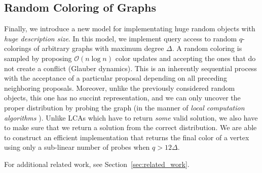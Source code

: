\subsection{Random Coloring of Graphs}%
\label{sec:random_coloring_of_graphs}
Finally, we introduce a new model for implementating huge random objects with \emph{huge description size}.
In this model, we implement query access to random $q$-colorings of arbitrary graphs with maximum degree $\Delta$.
A random coloring is sampled by proposing $\mathcal O(n\log n)$ color updates and accepting the ones that do not create a conflict (Glauber dynamics).
This is an inherently sequential process with the acceptance of a particular proposal depending on all preceding neighboring proposals.
Moreover, unlike the previously considered random objects, this one has no succint representation,
and we can only uncover the proper distribution by probing the graph (in the manner of \emph{local computation algorithms} \cite{LCA}).
Unlike LCAs which have to return \emph{some} valid solution, we also have to make sure that we return a solution from the correct distribution.
We are able to construct an efficient implementation that returns the final color of a vertex using only a sub-linear number of probes when $q>12\Delta$.

For additional related work, see Section~\ref{sec:related_work}.
